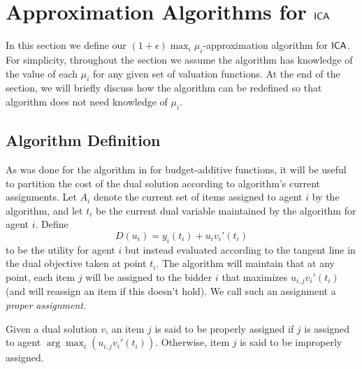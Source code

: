\section{Approximation Algorithms for $\mathsf{ICA}$} \label{sec:ica-algo}
In this section we define our $(1+ \epsilon)\max_i \mu_i$-approximation algorithm for $\mathsf{ICA}$.
For simplicity, throughout the section we assume the algorithm has knowledge of the value of each $\mu_i$ for any given set of valuation functions. 
At the end of the section, we will briefly discuss how the algorithm can be redefined so that algorithm does not need knowledge of $\mu_i$.



\subsection{Algorithm Definition}
\label{sec:pd-alg-def}

As was done for the algorithm in \cite{chakrabarty2010approximability} for budget-additive functions, it will be useful to partition the cost of the dual solution according to algorithm's current assignments. Let $A_i$ denote the current set of items assigned to agent $i$ by the algorithm, and let $t_i$ be the current dual variable maintained by the algorithm for agent $i$. Define
\begin{equation}
\label{eq:dual-agent}
D(u_i) = y_i(t_i) + u_i v_i'(t_i)
\end{equation}
to be the utility for agent $i$ but instead evaluated according 
to the tangent line in the dual objective taken at point $t_i$. The algorithm will maintain that at any point, each item $j$ will be assigned to the bidder $i$ that maximizes 
$u_{i,j}v_i'(t_i)$ (and will reassign an item if this doesn't hold). We call such an assignment a {\em proper assignment.} 


\begin{definition} \label{def:proper-allocation}
Given a dual solution $v$, an item $j$ is said to be properly assigned if $j$ is assigned to agent $\arg\max_{i}(u_{i,j}v_i'(t_i))$. Otherwise, item $j$ is said to be improperly assigned. 
\end{definition}

